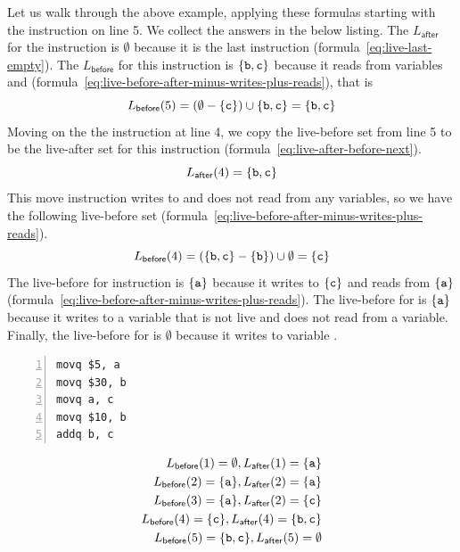 \documentclass[11pt]{book}
\begin{document}
Let us walk through the above example, applying these formulas
starting with the instruction on line 5. We collect the answers in the
below listing.  The $L_{\mathsf{after}}$ for the 
instruction is $\emptyset$ because it is the last instruction
(formula~\ref{eq:live-last-empty}).  The $L_{\mathsf{before}}$ for
this instruction is $\{\mathtt{b},\mathtt{c}\}$ because it reads from
variables  and 
(formula~\ref{eq:live-before-after-minus-writes-plus-reads}), that is
\[
   L_{\mathsf{before}}(5) = (\emptyset - \{\mathtt{c}\}) \cup \{ \mathtt{b}, \mathtt{c} \} = \{ \mathtt{b}, \mathtt{c} \}
\]
Moving on the the instruction  at line 4, we copy
the live-before set from line 5 to be the live-after set for this
instruction (formula~\ref{eq:live-after-before-next}).
\[
  L_{\mathsf{after}}(4) = \{ \mathtt{b}, \mathtt{c} \}
\]
This move instruction writes to  and does not read from any
variables, so we have the following live-before set
(formula~\ref{eq:live-before-after-minus-writes-plus-reads}).
\[
  L_{\mathsf{before}}(4) = (\{\mathtt{b},\mathtt{c}\} - \{\mathtt{b}\}) \cup \emptyset = \{ \mathtt{c} \}
\]
The live-before for instruction 
is $\{\mathtt{a}\}$ because it writes to $\{\mathtt{c}\}$ and reads from $\{\mathtt{a}\}$
(formula~\ref{eq:live-before-after-minus-writes-plus-reads}).  The
live-before for  is $\{\mathtt{a}\}$ because it writes to a
variable that is not live and does not read from a variable.
Finally, the live-before for  is $\emptyset$
because it writes to variable .
\begin{center}
\begin{minipage}{0.45\textwidth}
\begin{lstlisting}[numbers=left,numberstyle=\tiny]
movq $5, a
movq $30, b
movq a, c
movq $10, b
addq b, c
\end{lstlisting}
\end{minipage}
\vrule\hspace{10pt}
\begin{minipage}{0.45\textwidth}
\begin{align*}
L_{\mathsf{before}}(1)=  \emptyset, 
L_{\mathsf{after}}(1)=  \{\mathtt{a}\}\\
L_{\mathsf{before}}(2)=  \{\mathtt{a}\},
L_{\mathsf{after}}(2)=  \{\mathtt{a}\}\\
L_{\mathsf{before}}(3)=  \{\mathtt{a}\},
L_{\mathsf{after}}(2)=  \{\mathtt{c}\}\\
L_{\mathsf{before}}(4)=  \{\mathtt{c}\},
L_{\mathsf{after}}(4)=  \{\mathtt{b},\mathtt{c}\}\\
L_{\mathsf{before}}(5)=  \{\mathtt{b},\mathtt{c}\},
L_{\mathsf{after}}(5)=  \emptyset
\end{align*}
\end{minipage}
\end{center}
\end{document}
